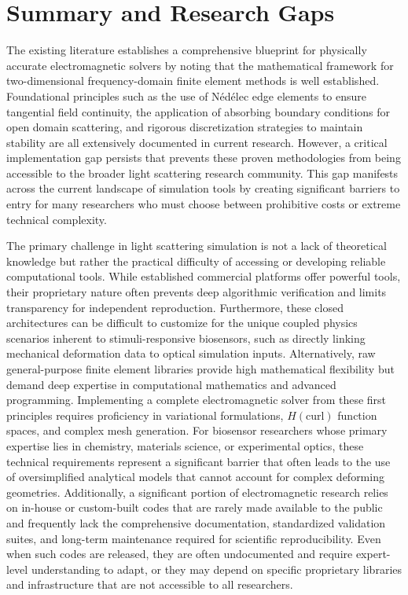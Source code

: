\documentclass[class=report, crop=false]{standalone}
\begin{document}
\section{Summary and Research Gaps}

The existing literature establishes a comprehensive blueprint for physically accurate electromagnetic solvers by noting that the mathematical framework for two-dimensional frequency-domain finite element methods is well established. Foundational principles such as the use of Nédélec edge elements to ensure tangential field continuity, the application of absorbing boundary conditions for open domain scattering, and rigorous discretization strategies to maintain stability are all extensively documented in current research. However, a critical implementation gap persists that prevents these proven methodologies from being accessible to the broader light scattering research community. This gap manifests across the current landscape of simulation tools by creating significant barriers to entry for many researchers who must choose between prohibitive costs or extreme technical complexity.

The primary challenge in light scattering simulation is not a lack of theoretical knowledge but rather the practical difficulty of accessing or developing reliable computational tools. While established commercial platforms offer powerful tools, their proprietary nature often prevents deep algorithmic verification and limits transparency for independent reproduction. Furthermore, these closed architectures can be difficult to customize for the unique coupled physics scenarios inherent to stimuli-responsive biosensors, such as directly linking mechanical deformation data to optical simulation inputs. Alternatively, raw general-purpose finite element libraries provide high mathematical flexibility but demand deep expertise in computational mathematics and advanced programming. Implementing a complete electromagnetic solver from these first principles requires proficiency in variational formulations, $H(\text{curl})$ function spaces, and complex mesh generation. For biosensor researchers whose primary expertise lies in chemistry, materials science, or experimental optics, these technical requirements represent a significant barrier that often leads to the use of oversimplified analytical models that cannot account for complex deforming geometries. Additionally, a significant portion of electromagnetic research relies on in-house or custom-built codes that are rarely made available to the public and frequently lack the comprehensive documentation, standardized validation suites, and long-term maintenance required for scientific reproducibility. Even when such codes are released, they are often undocumented and require expert-level understanding to adapt, or they may depend on specific proprietary libraries and infrastructure that are not accessible to all researchers.
\end{document}
